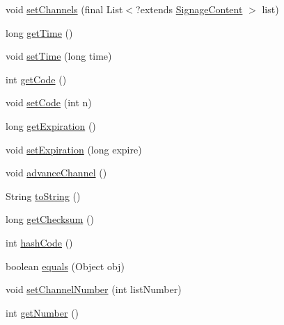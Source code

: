 \begin{DoxyCompactItemize}
\item 
void \hyperlink{classgov_1_1fnal_1_1ppd_1_1dd_1_1channel_1_1ChannelPlayList_abfcd48d8d992007dd8b7afd3ea1e1dd2}{set\-Channels} (final List$<$?extends \hyperlink{interfacegov_1_1fnal_1_1ppd_1_1dd_1_1signage_1_1SignageContent}{Signage\-Content} $>$ list)
\item 
long \hyperlink{classgov_1_1fnal_1_1ppd_1_1dd_1_1channel_1_1ChannelPlayList_aeffef12153803eb9b53b8465605926a9}{get\-Time} ()
\item 
void \hyperlink{classgov_1_1fnal_1_1ppd_1_1dd_1_1channel_1_1ChannelPlayList_ac1efd270a0a6ac0c723a6cbd7d97b9a5}{set\-Time} (long time)
\item 
int \hyperlink{classgov_1_1fnal_1_1ppd_1_1dd_1_1channel_1_1ChannelPlayList_a63f0a55d5f714b9b510b5d9b52ab5294}{get\-Code} ()
\item 
void \hyperlink{classgov_1_1fnal_1_1ppd_1_1dd_1_1channel_1_1ChannelPlayList_a054421b30bfa598b9f907facbba2dc6c}{set\-Code} (int n)
\item 
long \hyperlink{classgov_1_1fnal_1_1ppd_1_1dd_1_1channel_1_1ChannelPlayList_a6af41cecbc1b1c903c5dc7544466b169}{get\-Expiration} ()
\item 
void \hyperlink{classgov_1_1fnal_1_1ppd_1_1dd_1_1channel_1_1ChannelPlayList_a6685e37b070296e6c0e68604d3d61b8a}{set\-Expiration} (long expire)
\item 
void \hyperlink{classgov_1_1fnal_1_1ppd_1_1dd_1_1channel_1_1ChannelPlayList_a98bb559bcfd42b2f26aeb2082e2e89fd}{advance\-Channel} ()
\item 
String \hyperlink{classgov_1_1fnal_1_1ppd_1_1dd_1_1channel_1_1ChannelPlayList_ab53b318aa5cdd56a200e404912c1050b}{to\-String} ()
\item 
long \hyperlink{classgov_1_1fnal_1_1ppd_1_1dd_1_1channel_1_1ChannelPlayList_a7a41f216f9725c9167dbabfe1332e0f6}{get\-Checksum} ()
\item 
int \hyperlink{classgov_1_1fnal_1_1ppd_1_1dd_1_1channel_1_1ChannelPlayList_ad4dce7869f8dc2b89c663dd40c68be7f}{hash\-Code} ()
\item 
boolean \hyperlink{classgov_1_1fnal_1_1ppd_1_1dd_1_1channel_1_1ChannelPlayList_aa117d6780ca09a5e94592efcee06cc1c}{equals} (Object obj)
\item 
void \hyperlink{classgov_1_1fnal_1_1ppd_1_1dd_1_1channel_1_1ChannelPlayList_a8fc69999aaf34ff89f285b80ebe826e0}{set\-Channel\-Number} (int list\-Number)
\item 
int \hyperlink{classgov_1_1fnal_1_1ppd_1_1dd_1_1channel_1_1ChannelPlayList_a70afc652012758cd493013f94ef22efa}{get\-Number} ()
\end{DoxyCompactItemize}


